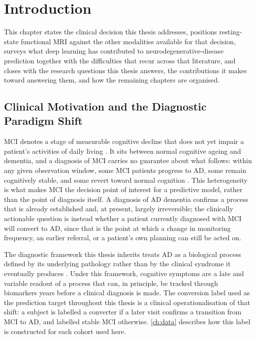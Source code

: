 
\chapter{Introduction}\label{ch:introduction}

This chapter states the clinical decision this thesis addresses, positions resting-state
functional \ac{MRI} against the other modalities available for that decision, surveys what
deep learning has contributed to neurodegenerative-disease prediction together with the
difficulties that recur across that literature, and closes with the research questions
this thesis answers, the contributions it makes toward answering them, and how the
remaining chapters are organised.

\section{Clinical Motivation and the Diagnostic Paradigm Shift}\label{sec:motivation}

\Ac{MCI} denotes a stage of measurable cognitive decline that does not yet impair a
patient's activities of daily living \parencite{petersen2004mci}. It sits between normal
cognitive ageing and dementia, and a diagnosis of \ac{MCI} carries no guarantee about what
follows: within any given observation window, some \ac{MCI} patients progress to \ac{AD},
some remain cognitively stable, and some revert toward normal cognition
\parencite{petersen2004mci}. This heterogeneity is what makes \ac{MCI} the decision point
of interest for a predictive model, rather than the point of diagnosis itself. A diagnosis
of \ac{AD} dementia confirms a process that is already established and, at present,
largely irreversible; the clinically actionable question is instead whether a patient
currently diagnosed with \ac{MCI} will convert to \ac{AD}, since that is the point at which
a change in monitoring frequency, an earlier referral, or a patient's own planning can
still be acted on.

The diagnostic framework this thesis inherits treats \ac{AD} as a biological process
defined by its underlying pathology rather than by the clinical syndrome it eventually
produces \parencite{jack2018niaaa}. Under this framework, cognitive symptoms are a late and
variable readout of a process that can, in principle, be tracked through biomarkers years
before a clinical diagnosis is made. The conversion label used as the prediction target
throughout this thesis is a clinical operationalisation of that shift: a subject is
labelled a converter if a later visit confirms a transition from \ac{MCI} to \ac{AD}, and
labelled stable \ac{MCI} otherwise. \autoref{ch:data} describes how this label is
constructed for each cohort used here.

